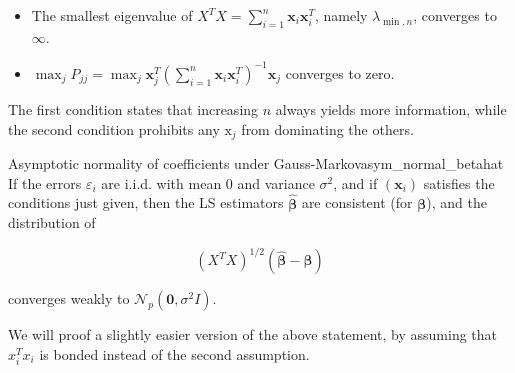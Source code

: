 \documentclass[11pt, %
	oneside, %
	english, %
	onehalfspacing, %
	]{article} %
\numberwithin{equation}{section}
\begin{document}
\begin{itemize}
    \item The smallest eigenvalue of $X^T X=\sum_{i=1}^n \mathbf{x}_i \mathbf{x}_i^T$, namely $\lambda_{\min , n}$, converges to $\infty$.
    \item $\max _j P_{j j}=\max _j \mathbf{x}_j^T\left(\sum_{i=1}^n \mathbf{x}_i \mathbf{x}_i^T\right)^{-1} \mathbf{x}_j$ converges to zero.
\end{itemize}

The first condition states that increasing $n$ always yields more information, while the second condition prohibits any $\mathrm{x}_j$ from dominating the others.

\begin{theorem}{Asymptotic normality of coefficients under Gauss-Markov}{asym_normal_betahat}
    If the errors $\varepsilon_i$ are i.i.d. with mean 0 and variance $\sigma^2$, and if $\left(\mathbf{x}_i\right)$ satisfies the conditions just given, then the LS estimators $\widehat{\mathbf{\beta}}$ are consistent (for $\mathbf{\beta}$), and the distribution of

    $$
    \left(X^T X\right)^{1 / 2}(\widehat{\mathbf{\beta}}-\mathbf{\beta})
    $$

    converges weakly to $\mathcal{N}_p\left(\mathbf{0}, \sigma^2 I\right)$.
\end{theorem}

We will proof a slightly easier version of the above statement, by assuming that $x_i^T x_i$ is bonded instead of the second assumption.
\end{document}
